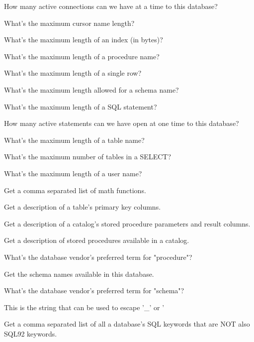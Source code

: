 \begin{description}
How many active connections can we have at a time to this database? 

What's the maximum cursor name length? 

What's the maximum length of an index (in bytes)? 

What's the maximum length of a procedure name? 

What's the maximum length of a single row? 

What's the maximum length allowed for a schema name? 

What's the maximum length of a SQL statement? 

How many active statements can we have open at one time to this database? 

What's the maximum length of a table name? 

What's the maximum number of tables in a SELECT? 

What's the maximum length of a user name? 

Get a comma separated list of math functions. 

Get a description of a table's primary key columns. 

Get a description of a catalog's stored procedure parameters and result columns. 

Get a description of stored procedures available in a catalog. 

What's the database vendor's preferred term for "procedure"? 

Get the schema names available in this database. 

What's the database vendor's preferred term for "schema"? 

This is the string that can be used to escape '\_' or '%

Get a comma separated list of all a database's SQL keywords that are NOT also SQL92 keywords. 


\end{description}
